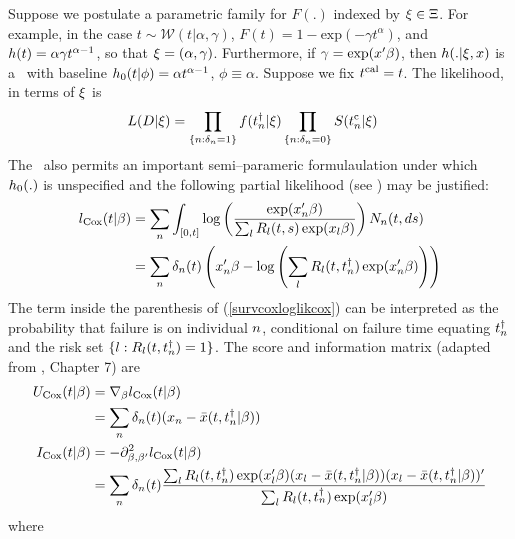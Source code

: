 Suppose we postulate a parametric family for $F(.)$ indexed by $\xi\in\Xi$. For example, in the case $t\sim\mathcal{W}(t|\alpha,\gamma)$, $F(t)=1-\mathrm{exp}(-\gamma t^\alpha)$, and $h(t)=\alpha \gamma t^{\alpha-1}$, so that  $\xi=(\alpha,\gamma)$. Furthermore, if $\gamma=\exp(x'\beta)$, then $h(.|\xi,x)$ is a \ph\ with baseline $h_{0}(t|\phi)=\alpha t^{\alpha-1}$, $\phi\equiv\alpha$. Suppose we fix $t^{\mathrm{cal}}=t$. The likelihood, in terms of $\xi$ is %
\begin{align}\label{lik_surv_anal_param_1}
L(D|\survfullpar)&=\prod_{\{n:\isfail_\nentry=1\}} f(\tfail_n|\survfullpar)\prod_{\{\nentry:\isfail_\nentry=0\}} \surv(\tcens_n|\survfullpar)%
\end{align}
The \ph\ also permits an important semi--parameric formulaulation under which $h_{0}(.)$ is unspecified and the following partial likelihood (see \cite{1983SellkeSiegmund}) may be justified: 
\begin{align}\label{survcoxlogliksellke}
\coxloglik(t|\survfulleffect)&=\survcoxlogliksellke  %
\\\label{survcoxloglikcox}
&=\survcoxloglikcox
\end{align}%
The term inside the parenthesis of (\ref{survcoxloglikcox}) can be interpreted as the probability that failure is on individual $n$, conditional on failure time equating $t^{\dag}_n$ and the risk set $\{l:R_l(t,t^{\dag}_n)=1\}$. %
The score and information matrix (adapted from \cite{2003Lawless}, Chapter 7) are
\begin{align}\label{coxscore}
U_{\mathrm{Cox}}(t|\beta)&=\nabla_{\beta} l_{\mathrm{Cox}}(t|\beta)\\\label{coxscore2}
&=\sum_{n} \delta_{n}(t) (x_n-\bar x(t,t^{\dag}_n|\beta))\\
\label{coxinfo}
I_{\mathrm{Cox}}(t|\beta)&=-\partial_{\beta,\beta'}^2 l_{\mathrm{Cox}}(t|\beta)\\\label{coxinfo2}
&=\sum_n \delta_{n}(t) \frac{\sum_l R_l(t,t^{\dag}_n)\exp(x_l'\beta)(x_l-\bar {x}(t,t^{\dag}_n|\beta))(x_l-\bar {x}(t,t^{\dag}_n|\beta))'}{\sum_l R_l(t,t^{\dag}_n)\exp(x_l'\beta)}
\end{align}where
